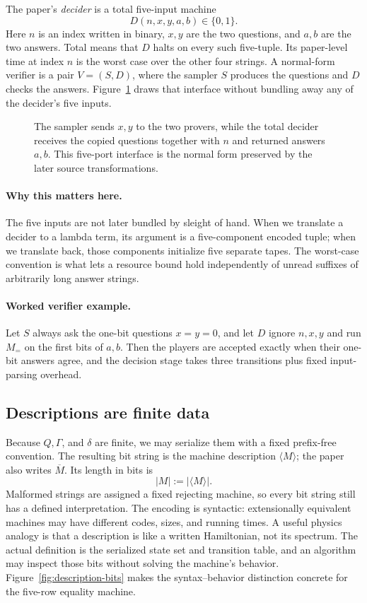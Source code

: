The paper's \emph{decider} is a total five-input machine
\[
 D(n,x,y,a,b)\in\{0,1\}.
\]
Here \(n\) is an index written in binary, \(x,y\) are the two questions, and
\(a,b\) are the two answers.  Total means that \(D\) halts on every such
five-tuple.  Its paper-level time at index \(n\) is the worst case over the
other four strings.  A normal-form verifier is a pair \(V=(S,D)\), where the
sampler \(S\) produces the questions and \(D\) checks the answers.
Figure~\ref{fig:verifier-normal-form} draws that interface without bundling
away any of the decider's five inputs.

\begin{figure}[t]
\centering

\caption{The sampler sends \(x,y\) to the two provers, while the total decider receives the copied questions together with \(n\) and returned answers \(a,b\).  This five-port interface is the normal form preserved by the later source transformations.}
\label{fig:verifier-normal-form}
\end{figure}

\paragraph{Why this matters here.}
The five inputs are not later bundled by sleight of hand.  When we translate a
decider to a lambda term, its argument is a five-component encoded tuple; when
we translate back, those components initialize five separate tapes.  The
worst-case convention is what lets a resource bound hold independently of
unread suffixes of arbitrarily long answer strings.

\paragraph{Worked verifier example.}
Let \(S\) always ask the one-bit questions \(x=y=0\), and let \(D\) ignore
\(n,x,y\) and run \(M_=\) on the first bits of \(a,b\).  Then the players are
accepted exactly when their one-bit answers agree, and the decision stage
takes three transitions plus fixed input-parsing overhead.

\subsection{Descriptions are finite data}

Because \(Q,\Gamma\), and \(\delta\) are finite, we may serialize them with a
fixed prefix-free convention.  The resulting bit string is the machine
description \(\langle M\rangle\); the paper also writes \(\overline M\).
Its length in bits is
\[
 |M|:=|\langle M\rangle|.
\]
Malformed strings are assigned a fixed rejecting machine, so every bit string
still has a defined interpretation.  The encoding is syntactic: extensionally
equivalent machines may have different codes, sizes, and running times.  A
useful physics analogy is that a description is like a written Hamiltonian,
not its spectrum.  The actual definition is the serialized state set and
transition table, and an algorithm may inspect those bits without solving the
machine's behavior.
Figure~\ref{fig:description-bits} makes the syntax--behavior distinction
concrete for the five-row equality machine.

